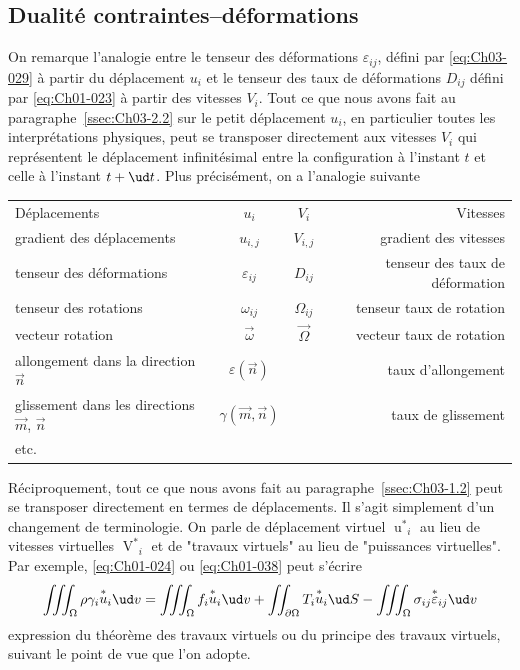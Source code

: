 \subsection{Dualité contraintes--déformations} \label{ssec:Ch03-2.3}
On remarque l'analogie entre le tenseur des déformations $\varepsilon_{ij}$, défini par \eqref{eq:Ch03-029} à partir du déplacement $u_i$ et le tenseur des taux de déformations $D_{ij}$ défini par \eqref{eq:Ch01-023} à partir des vitesses $V_i$.
Tout ce que nous avons fait au paragraphe~\ref{ssec:Ch03-2.2} sur le petit déplacement $u_i$, en particulier toutes les interprétations physiques, peut se transposer directement aux vitesses $V_i$ qui représentent le déplacement infinitésimal entre la configuration à l'instant $t$ et celle à l'instant $t+\ud t$.
Plus précisément, on a l'analogie suivante
\begin{center}
    \begin{tabular}[c]{lccr}
        Déplacements & $u_i$ & $V_i$ & Vitesses \\
        gradient des déplacements & $u_{i,j}$ & $V_{i,j}$ & gradient des vitesses \\
        tenseur des déformations & $\varepsilon_{ij}$ & $D_{ij}$ & tenseur des taux de déformation \\
        tenseur des rotations & $\omega_{ij}$ & $\Omega_{ij}$ & tenseur taux de rotation \\
        vecteur rotation & $\vec{\omega}$ & $\vec{\Omega}$ & vecteur taux de rotation \\
        allongement dans la direction $\vec{n}$ & $\varepsilon (\vec{n})$ & & taux d'allongement \\
        glissement dans les directions $\vec{m}$, $\vec{n}$ & $\gamma (\vec{m},\vec{n})$ & & taux de glissement \\
        etc.
    \end{tabular}
\end{center}

Réciproquement, tout ce que nous avons fait au paragraphe~\ref{ssec:Ch03-1.2} peut se transposer directement en termes de déplacements.
Il s'agit simplement d'un changement de terminologie.
On parle de déplacement virtuel $\displaystyle{\mathop{u}^{*}}_i$ au lieu de vitesses virtuelles $\displaystyle{\mathop{V}^{*}}_i$ et de "travaux virtuels" au lieu de "puissances virtuelles".
Par exemple, \eqref{eq:Ch01-024} ou \eqref{eq:Ch01-038} peut s'écrire
\begin{equation}
    \iiint_{\Omega} \rho \gamma_i {\mathop{u}^*}_i \ud v = \iiint_{\Omega} f_i {\mathop{u}^*}_i \ud v + \iint_{\partial \Omega} T_i {\mathop{u}^*}_i \ud S - \iiint_{\Omega} \sigma_{ij} {\mathop{\varepsilon}^*}_{ij} \ud v
    \label{eq:Ch03-046}
\end{equation}
expression du théorème des travaux virtuels ou du principe des travaux virtuels, suivant le point de vue que l'on adopte.

